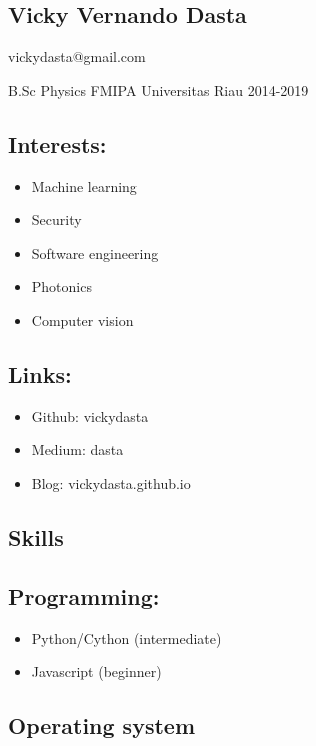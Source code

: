 \subsection{Vicky Vernando Dasta}\label{vicky-vernando-dasta}

vickydasta@gmail.com

B.Sc Physics FMIPA Universitas Riau 2014-2019

\subsection{Interests:}\label{interests}

\begin{itemize}
\tightlist
\item
  Machine learning
\item
  Security
\item
  Software engineering
\item
  Photonics
\item
  Computer vision
\end{itemize}

\subsection{Links:}\label{links}

\begin{itemize}
\tightlist
\item
  Github: vickydasta
\item
  Medium: dasta
\item
  Blog: vickydasta.github.io
\end{itemize}

\subsection{Skills}\label{skills}

\subsection{Programming:}\label{programming}

\begin{itemize}
\tightlist
\item
  Python/Cython (intermediate)
\item
  Javascript (beginner)
\end{itemize}

\subsection{Operating system}\label{operating-system}

